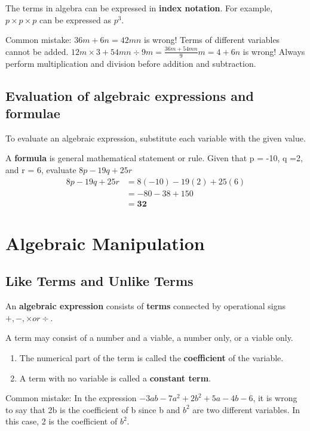 \documentclass[../main]{subfiles}
\begin{document}
The terms in algebra can be expressed in \textbf{index notation}. For example,
\(p \times p \times p\) can be expressed as \(p^3\).

Common mistake:
\(36m + 6n = 42mn \) is wrong! Terms of different variables cannot be added.
\(12m \times 3 + 54mn \div 9m = \frac {36m + 54mn} 9m = 4 + 6n\) is wrong!
Always perform multiplication and division before addition and subtraction.

\subsection{Evaluation of algebraic expressions and formulae}
To evaluate an algebraic expression, substitute each variable with the given
value.

A \textbf{formula} is general mathematical statement or rule.
Given that p = -10, q =2, and r = 6, evaluate 
\(8p - 19q +25r\)
\begin{align*}
 8p-19q + 25 r &= 8(-10) - 19(2)+ 25(6)\\
               &= -80-38 +150 \\
               &=\mathbf{32}
\end{align*}

\section{Algebraic Manipulation}
\subsection{Like Terms and Unlike Terms}

An \textbf{algebraic expression} consists of \textbf{terms} connected by
operational signs \(+, -, \times or \div\). 

A term may consist of a number and a viable, a number only, or a viable only.
\begin{enumerate}
\item  The numerical part of the term is called the \textbf{coefficient} of the
  variable. 
\item  A term with no variable is called a \textbf{constant term}.
  
\end{enumerate}

Common mistake:
In the expression \(-3ab - 7a^2 + 2b^2 + 5a - 4b - 6\), it is wrong to say that
2b is the coefficient of b since b and \(b^2\) are two different variables.
In this case, 2 is the coefficient of \(b^2\).
\end{document}
